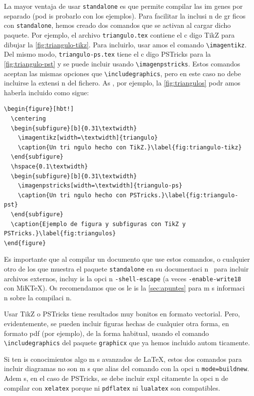 \documentclass{article}
\begin{document}
La mayor ventaja de usar \verb+standalone+ es que permite compilar las im genes por separado (pod is probarlo con los ejemplos).
Para facilitar la inclusi n de gr ficos con \verb+standalone+, hemos creado dos comandos que se activan al cargar dicho paquete.
Por ejemplo, el archivo \verb+triangulo.tex+ contiene el c digo TikZ para dibujar la \cref{fig:triangulo-tikz}.
Para incluirlo, usar amos el comando \verb+\imagentikz+.
Del mismo modo, \verb+triangulo-ps.tex+ tiene el c digo PSTricks para la \cref{fig:triangulo-pst} y se puede incluir usando \verb+\imagenpstricks+.
Estos comandos aceptan las mismas opciones que \verb+\includegraphics+, pero en este caso no debe incluirse la extensi n del fichero.
As , por ejemplo, la \cref{fig:triangulos} podr amos haberla incluido como sigue:
\begin{verbatim}
\begin{figure}[hbt!]
  \centering
  \begin{subfigure}[b]{0.31\textwidth}
    \imagentikz[width=\textwidth]{triangulo}
    \caption{Un tri ngulo hecho con TikZ.}\label{fig:triangulo-tikz}
  \end{subfigure}
  \hspace{0.1\textwidth}
  \begin{subfigure}[b]{0.31\textwidth}
    \imagenpstricks[width=\textwidth]{triangulo-ps}
    \caption{Un tri ngulo hecho con PSTricks.}\label{fig:triangulo-pst}
  \end{subfigure}
  \caption{Ejemplo de figura y subfiguras con TikZ y PSTricks.}\label{fig:triangulos}
\end{figure}
\end{verbatim}

Es importante que al compilar un documento que use estos comandos, o cualquier otro de los que muestra el paquete \verb+standalone+ en su documentaci n~\cite{standalone} para incluir archivos externos, incluy is la opci n \verb+-shell-escape+ (a veces \verb+-enable-write18+ con MiK\TeX).
Os recomendamos que os le is la \cref{sec:apuntes} para m s informaci n sobre la compilaci n.

Usar TikZ o PSTricks tiene resultados muy bonitos en formato vectorial.
Pero, evidentemente, se pueden incluir figuras hechas de cualquier otra forma, en formato pdf (por ejemplo), de la forma habitual, usando el comando \verb+\includegraphics+ del paquete \verb+graphicx+ que ya hemos incluido autom ticamente.

\begin{nota}
Si ten is conocimientos algo m s avanzados de \LaTeX{}, estos dos comandos para incluir diagramas no son m s que alias del comando \verb++ con la opci n \verb+mode=buildnew+.
Adem s, en el caso de PSTricks, se debe incluir expl citamente la opci n de compilar con \verb+xelatex+ porque ni \verb+pdflatex+ ni \verb+lualatex+ son compatibles.
\end{nota}
\end{document}
